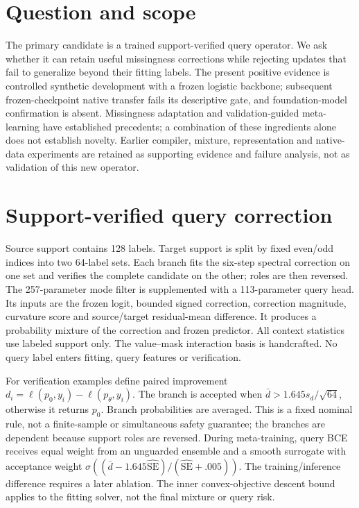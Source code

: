 \documentclass[10pt]{article}
\begin{document}
\section{Question and scope}
The primary candidate is a trained support-verified query operator. We ask whether it can retain useful missingness corrections while rejecting updates that fail to generalize beyond their fitting labels. The present positive evidence is controlled synthetic development with a frozen logistic backbone; subsequent frozen-checkpoint native transfer fails its descriptive gate, and foundation-model confirmation is absent. Missingness adaptation and validation-guided meta-learning have established precedents\cite{zhou2023,rockenschaub2024,ren2018,metaweight}; a combination of these ingredients alone does not establish novelty. Earlier compiler, mixture, representation and native-data experiments are retained as supporting evidence and failure analysis, not as validation of this new operator.

\section{Support-verified query correction}
Source support contains 128 labels. Target support is split by fixed even/odd indices into two 64-label sets. Each branch fits the six-step spectral correction on one set and verifies the complete candidate on the other; roles are then reversed. The 257-parameter mode filter is supplemented with a 113-parameter query head. Its inputs are the frozen logit, bounded signed correction, correction magnitude, curvature score and source/target residual-mean difference. It produces a probability mixture of the correction and frozen predictor. All context statistics use labeled support only. The value--mask interaction basis is handcrafted. No query label enters fitting, query features or verification.

For verification examples define paired improvement $d_i=\ell(p_0,y_i)-\ell(p_\theta,y_i)$. The branch is accepted when $\bar d>1.645s_d/\sqrt{64}$, otherwise it returns $p_0$. Branch probabilities are averaged. This is a fixed nominal rule, not a finite-sample or simultaneous safety guarantee; the branches are dependent because support roles are reversed. During meta-training, query BCE receives equal weight from an unguarded ensemble and a smooth surrogate with acceptance weight $\sigma((\bar d-1.645\widehat{\mathrm{SE}})/(\widehat{\mathrm{SE}}+.005))$. The training/inference difference requires a later ablation. The inner convex-objective descent bound applies to the fitting solver, not the final mixture or query risk.
\end{document}

